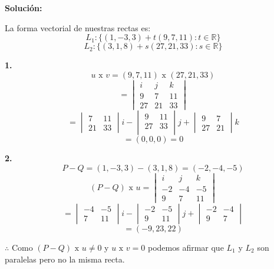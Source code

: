 \documentclass{article}
\begin{document}
\begin{enumerate}
    \textbf{Solución:}
    \vspace{10pt}

    La forma vectorial de nuestras rectas es: 
    $$L_1: \{(1,-3,3)+t(9,7,11): t\in\mathbb{R}\}$$
    $$L_2: \{(3,1,8)+s(27,21,33): s\in\mathbb{R}\}$$
    \begin{minipage}[c]{0.5cm}
        \textbf{1.}
        $$ u \text{ x } v = (9,7,11) \text{ x }(27,21,33)$$
        $$= \begin{vmatrix}
            i & j & k \\
            9 & 7 & 11\\
            27 & 21 & 33
        \end{vmatrix}$$
        $$= \begin{vmatrix}
            7 & 11 \\
            21 & 33
        \end{vmatrix}i - \begin{vmatrix}
            9 & 11 \\
            27 & 33\\
        \end{vmatrix}j+\begin{vmatrix}
            9 & 7 \\
            27 & 21
        \end{vmatrix}k$$
        $$= (0, 0, 0) = 0$$
    \end{minipage}\hspace*{6cm}\begin{minipage}[c]{0.5cm}
        \textbf{2.}
        $$P-Q = (1,-3,3)- (3,1,8) = (-2, -4, -5 )$$
        $$(P-Q) \text{ x } u = \begin{vmatrix}
            i & j & k \\
            -2 & -4 & -5 \\
            9 & 7 & 11
        \end{vmatrix}$$
        $$= \begin{vmatrix}
            -4 & -5 \\
            7 & 11 
        \end{vmatrix}i - \begin{vmatrix}
            -2 & -5 \\
            9 & 11
        \end{vmatrix}j + \begin{vmatrix}
            -2 & -4 \\
            9 & 7
        \end{vmatrix}$$
        $$=(-9, 23, 22)$$
    \end{minipage}

    $\therefore$ Como $(P-Q) \text{ x } u\neq 0$ y $ u \text{ x } v= 0 $ podemos afirmar que $L_1$ y $L_2$ son paralelas 
    pero no la misma recta.

\end{enumerate}
\end{document}

